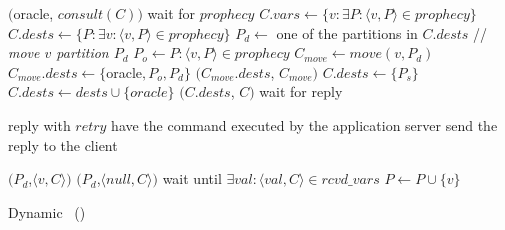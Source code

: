 \begin{algorithm}[h!]
\small

\begin{distribalgo}[1]

\vspace{1.25mm}


\vspace{1.0mm}

        \STATE \amcast$($oracle, $consult(C))$
        \STATE wait for $prophecy$
        \STATE $C.vars \leftarrow \{v: \exists P : \langle v, P \rangle \in prophecy \}$
        \STATE $C.dests \leftarrow \{P: \exists v : \langle v, P \rangle \in prophecy \}$
            \STATE $P_d \leftarrow$ one of the partitions in $C.dests$
                \STATE // \textit{move $v$ partition $P_d$}
                \STATE $P_o \leftarrow P : \langle v, P \rangle \in prophecy$
                \STATE $C_{move} \leftarrow move(v,P_d)$
                \STATE $C_{move}.dests \leftarrow \{$oracle$,P_o,P_d\}$
                \STATE \amcast$(C_{move}.dests$, $C_{move})$
            \ENDFOR
            \STATE $C.dests \leftarrow \{ P_s \}$
        \ENDIF
            \STATE $C.dests \leftarrow dests \cup \{oracle\}$
        \ENDIF
        \STATE \amcast$(C.dests$, $C)$
        \STATE wait for reply
    \ENDINDENT
\ENDINDENT

\vspace{1.25mm}


\vspace{1.0mm}

            \STATE reply with $retry$
        \ELSE
            \STATE have the command executed by the application server
            \STATE send the reply to the client
        \ENDIF
    \ENDINDENT

\vspace{1.0mm}
                \STATE \rmcast$(P_d$,$\langle v, C \rangle)$
            \ELSE
                \STATE \rmcast$(P_d$,$\langle null, C \rangle)$
            \ENDIF
        \ENDIF
                \STATE wait until $\exists val : \langle val, C \rangle \in rcvd\_vars$
                    \STATE $P \leftarrow P \cup \{v\}$
                \ENDIF
    \ENDINDENT
\ENDINDENT

\caption{Dynamic \ssmr\ (\dssmr)}
\label{alg:dssmr}
\end{distribalgo}
\end{algorithm}